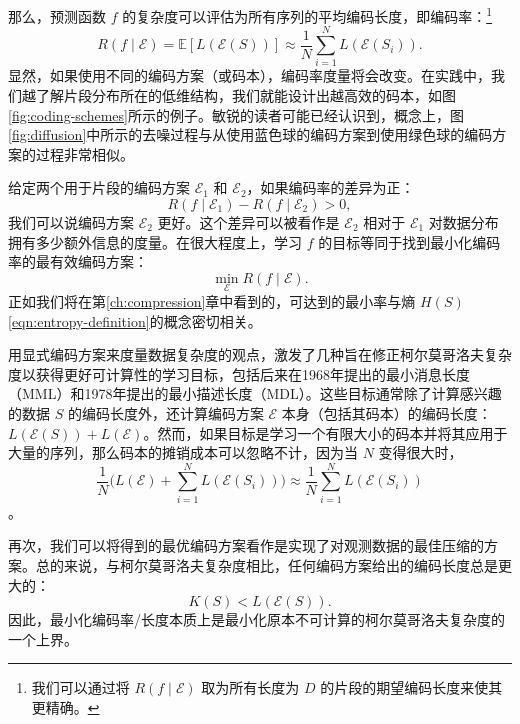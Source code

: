 \documentclass[../../book-main_zh.tex]{subfiles}
\begin{document}
那么，预测函数 $f$ 的复杂度可以评估为所有序列的平均编码长度，即编码率：\footnote{我们可以通过将 $R(f\mid \mathcal{E})$ 取为所有长度为 $D$ 的片段的期望编码长度来使其更精确。}
\begin{equation}
   R(f \mid \mathcal E) = \mathbb{E}[L(\mathcal{E}(S))] \approx \frac{1}{N}\sum_{i=1}^N L(\mathcal{E}(S_i)). 
   \label{eqn:coding-rate}
\end{equation}
显然，如果使用不同的编码方案（或码本），编码率度量将会改变。在实践中，我们越了解片段分布所在的低维结构，我们就能设计出越高效的码本，如图\ref{fig:coding-schemes}所示的例子。敏锐的读者可能已经认识到，概念上，图\ref{fig:diffusion}中所示的去噪过程与从使用蓝色球的编码方案到使用绿色球的编码方案的过程非常相似。


给定两个用于片段的编码方案 $\mathcal{E}_1$ 和 $\mathcal{E}_2$，如果编码率的差异为正：
\begin{equation}
   R(f \mid \mathcal E_1) -  R(f \mid \mathcal E_2) > 0, 
\end{equation}
我们可以说编码方案 $\mathcal{E}_2$ 更好。这个差异可以被看作是 $\mathcal{E}_2$ 相对于 $\mathcal{E}_1$ 对数据分布拥有多少额外信息的度量。在很大程度上，学习 $f$ 的目标等同于找到最小化编码率的最有效编码方案：
\begin{equation}
   \min_{\mathcal{E}} R(f \mid \mathcal E). 
\end{equation}
正如我们将在第\ref{ch:compression}章中看到的，可达到的最小率与熵 $H(S)$ \eqref{eqn:entropy-definition}的概念密切相关。


\begin{remark}\label{rem:computable-complexity}
    {用显式编码方案来度量数据复杂度的观点，激发了几种旨在修正柯尔莫哥洛夫复杂度以获得更好可计算性的学习目标\cite{WallaceC1999}，包括后来在1968年提出的最小消息长度（MML）\cite{WallaceC1968}和1978年提出的最小描述长度（MDL）\cite{Rissanen-1978,HansenM2001}。这些目标通常除了计算感兴趣的数据 $S$ 的编码长度外，还计算编码方案 $\mathcal{E}$ 本身（包括其码本）的编码长度：$L(\mathcal E(S)) + L(\mathcal E)$。然而，如果目标是学习一个有限大小的码本并将其应用于大量的序列，那么码本的摊销成本可以忽略不计，因为当 $N$ 变得很大时，$$\frac{1}{N}\Big( L(\mathcal{E}) + \sum_{i=1}^N L(\mathcal{E}(S_i))\Big) \approx \frac{1}{N}\sum_{i=1}^N L(\mathcal{E}(S_i))$$。}
\end{remark}

再次，我们可以将得到的最优编码方案看作是实现了对观测数据的最佳压缩的方案。总的来说，与柯尔莫哥洛夫复杂度相比，任何编码方案给出的编码长度总是更大的：
\begin{equation}
    K(S) < L( \mathcal E(S)).
\end{equation} 
因此，最小化编码率/长度本质上是最小化原本不可计算的柯尔莫哥洛夫复杂度的一个上界。
\end{document}
